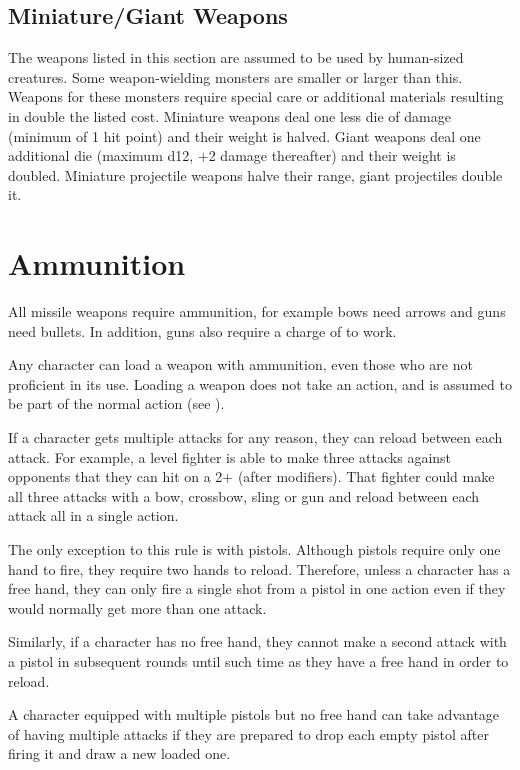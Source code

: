 \begin{multicols*}{2}
\subsection{Miniature/Giant Weapons}
The weapons listed in this section are assumed to be used by human-sized creatures. Some weapon-wielding monsters are smaller or larger than this. Weapons for these monsters require special care or additional materials resulting in double the listed cost. Miniature weapons deal one less die of damage (minimum of 1 hit point) and their weight is halved. Giant weapons deal one additional die (maximum d12, +2 damage thereafter) and their weight is doubled. Miniature projectile weapons halve their range, giant projectiles double it.

\section{Ammunition}
All missile weapons require ammunition, for example bows need arrows and guns need bullets. In addition, guns also require a charge of  to work.

Any character can load a weapon with ammunition, even those who are not proficient in its use. Loading a weapon does not take an action, and is assumed to be part of the normal  action (see ).

If a character gets multiple attacks for any reason, they can reload between each attack. For example, a  level fighter is able to make three attacks against opponents that they can hit on a 2+ (after modifiers). That fighter could make all three attacks with a bow, crossbow, sling or gun and reload between each attack all in a single  action.

The only exception to this rule is with pistols. Although pistols require only one hand to fire, they require two hands to reload. Therefore, unless a character has a free hand, they can only fire a single shot from a pistol in one  action even if they would normally get more than one attack.

Similarly, if a character has no free hand, they cannot make a second attack with a pistol in subsequent rounds until such time as they have a free hand in order to reload.

A character equipped with multiple pistols but no free hand can take advantage of having multiple attacks if they are prepared to drop each empty pistol after firing it and draw a new loaded one.


\end{multicols*}
